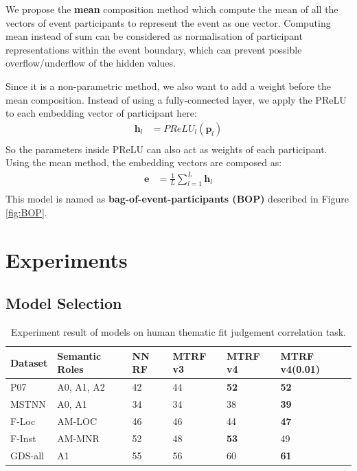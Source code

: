 \documentclass[a4paper]{article}
\begin{document}
We propose the \textbf{mean} composition method which compute the mean of all the  vectors of event participants to represent the event as one vector. Computing mean instead of sum can be considered as normalisation of participant representations within the event boundary, which can prevent possible overflow/underflow of the hidden values. 

Since it is a non-parametric method, we also want to add a weight before the mean composition. Instead of using a fully-connected layer, we apply the PReLU to each embedding vector of participant here: 
\begin{equation} \label{eq:nonlinearity_bop}
\begin{aligned}
    \mathbf{h}_l
        &= PReLU_l(\mathbf{p}_l) \\
\end{aligned}
\end{equation}
So the parameters inside PReLU can also act as weights of each participant. Using the mean method, the embedding vectors are composed as:
\begin{equation} \label{eq:mean_comp_bop}
\begin{aligned}
    \mathbf{e}
        &= \frac{1}{L} \sum_{l=1}^{L} \mathbf{h}_{l} \\
\end{aligned}
\end{equation}
This model is named as \textbf{bag-of-event-participants (BOP)} described in Figure \ref{fig:BOP}. 




\section{Experiments}
\subsection{Model Selection}





\begin{table}[t]
\centering
\begin{tabular}{l|l|l|l|l|l}
Dataset &   Semantic Roles  &   NN RF   &   MTRF v3 &   MTRF v4     &   MTRF v4(0.01)    \\ \hline
P07     &   A0, A1, A2      &   42      &   44      &   \textbf{52} &   \textbf{52}     \\
MSTNN   &   A0, A1          &   34      &   34      &   38          &   \textbf{39}     \\
F-Loc   &   AM-LOC          &   46      &   46      &   44          &   \textbf{47}     \\
F-Inst  &   AM-MNR          &   52      &   48      &   \textbf{53} &   49              \\
GDS-all &   A1              &   55      &   56      &   60          &   \textbf{61}     \\
\end{tabular}
\caption{\label{tab:widgets} Experiment result of models on human thematic fit judgement correlation task.}
\end{table}
\end{document}
